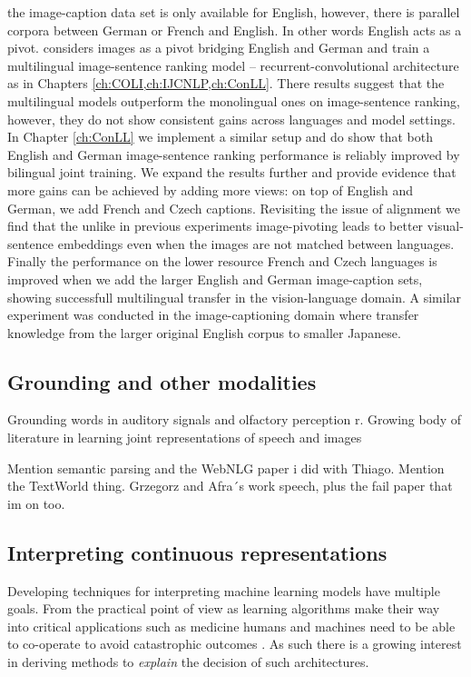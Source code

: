 the image-caption data set is only available for English, however, there is parallel corpora between German
or French and English. In other words English acts as a pivot.
\cite{gella2017image} considers images as a pivot bridging English and German and train a multilingual
image-sentence ranking model -- recurrent-convolutional architecture as in Chapters \ref{ch:COLI,ch:IJCNLP,ch:ConLL}.
There results suggest that the multilingual models outperform the monolingual ones on image-sentence
ranking, however, they do not show consistent gains across languages and model settings.
In Chapter \ref{ch:ConLL} we implement a similar setup and do show that both English and German image-sentence
ranking performance is reliably improved by bilingual joint training. We expand the results further and
provide evidence that more gains can be achieved by adding more views: on top of English and German, we
add French and Czech captions. Revisiting the issue of alignment we find that the unlike in previous
experiments \cite{gella2017image,calixto2017multilingual,rotman2018bridging} image-pivoting leads to
better visual-sentence embeddings even when the images are not matched between languages. Finally
the performance on the lower resource French and Czech languages is improved when we add the larger
English and German image-caption sets, showing successfull multilingual transfer in the vision-language
domain. A similar experiment was conducted in the image-captioning domain where \cite{miyazaki2016cross}
transfer knowledge from the larger original English corpus to smaller Japanese.



\subsection{Grounding and other modalities}
Grounding words in auditory signals \cite{kiela2015multi,lopopolo2015sound} and
 olfactory perception \cite{kiela2015grounding}r. Growing body of literature in learning joint representations
 of speech and images \cite{harwath2016unsupervised,chrupala2017representations,harwath2018jointly}


Mention semantic parsing and the WebNLG paper i did with Thiago. Mention the TextWorld thing. Grzegorz
and Afra´s work speech, plus the fail paper that im on too.

\subsection{Interpreting continuous representations}
\label{sec:interpret}
Developing techniques for interpreting machine learning models have multiple goals. From the practical point of view as learning algorithms
make their way into critical applications such as medicine humans and machines need to be able to co-operate to avoid catastrophic outcomes \cite{caruana2015intelligible}.
As such there is a growing interest in deriving methods to \emph{explain} the decision of such architectures.

